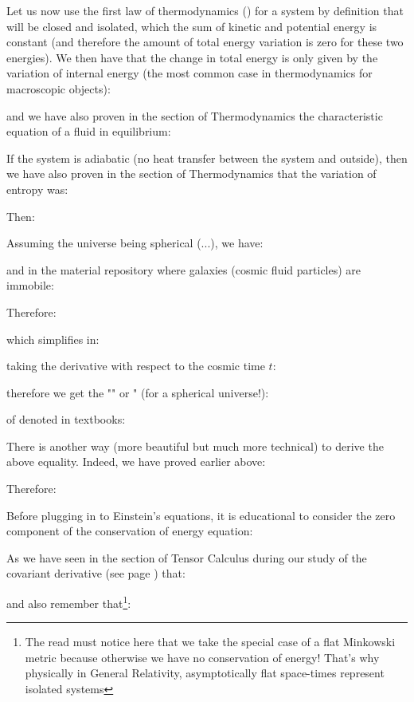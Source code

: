 	Let us now use the first law of thermodynamics () for a system by definition that will be closed and isolated, which the sum of kinetic and potential energy is constant (and therefore the amount of total energy variation is zero for these two energies). We then have that the change in total energy is only given by the variation of internal energy (the most common case in thermodynamics for macroscopic objects):
	
	and we have also proven in the section of Thermodynamics the characteristic equation of a fluid in equilibrium:
	
	If the system is adiabatic (no heat transfer between the system and outside), then we have also proven in the section of Thermodynamics that the variation of entropy was:
	
	Then:
	
	Assuming the universe being spherical (...), we have:
	
	and in the material repository where galaxies (cosmic fluid particles) are immobile:
	
	Therefore:
	
	which simplifies in:
	
	taking the derivative with respect to the cosmic time $t$:
	
	therefore we get the "" or " (for a spherical universe!):
	
	of denoted in textbooks:
	
	There is another way (more beautiful but much more technical) to derive the above equality. Indeed, we have proved earlier above:
	
	Therefore:
	
	Before plugging in to Einstein's equations, it is educational to consider the zero component of the conservation of energy equation:
	
	As we have seen in the section of Tensor Calculus during our study of the covariant derivative (see page \pageref{covariant derivative}) that:
	
	and also remember that\footnote{The read must notice here that we take the special case of a flat Minkowski metric because otherwise we have no conservation of energy! That's why physically in General Relativity, asymptotically flat space-times represent isolated systems}:
	
